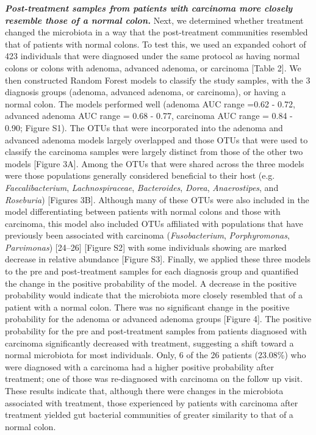 \documentclass[12pt,]{article}
\begin{document}
\textbf{\emph{Post-treatment samples from patients with carcinoma more
closely resemble those of a normal colon.}} Next, we determined whether
treatment changed the microbiota in a way that the post-treatment
communities resembled that of patients with normal colons. To test this,
we used an expanded cohort of 423 individuals that were diagnosed under
the same protocol as having normal colons or colons with adenoma,
advanced adenoma, or carcinoma {[}Table 2{]}. We then constructed Random
Forest models to classify the study samples, with the 3 diagnosis groups
(adenoma, advanced adenoma, or carcinoma), or having a normal colon. The
models performed well (adenoma AUC range =0.62 - 0.72, advanced adenoma
AUC range = 0.68 - 0.77, carcinoma AUC range = 0.84 - 0.90; Figure S1).
The OTUs that were incorporated into the adenoma and advanced adenoma
models largely overlapped and those OTUs that were used to classify the
carcinoma samples were largely distinct from those of the other two
models {[}Figure 3A{]}. Among the OTUs that were shared across the three
models were those populations generally considered beneficial to their
host (e.g. \emph{Faecalibacterium}, \emph{Lachnospiraceae},
\emph{Bacteroides}, \emph{Dorea}, \emph{Anaerostipes}, and
\emph{Roseburia}) {[}Figures 3B{]}. Although many of these OTUs were
also included in the model differentiating between patients with normal
colons and those with carcinoma, this model also included OTUs
affiliated with populations that have previously been associated with
carcinoma (\emph{Fusobacterium}, \emph{Porphyromonas},
\emph{Parvimonas}) {[}24--26{]} {[}Figure S2{]} with some individuals
showing are marked decrease in relative abundance {[}Figure S3{]}.
Finally, we applied these three models to the pre and post-treatment
samples for each diagnosis group and quantified the change in the
positive probability of the model. A decrease in the positive
probability would indicate that the microbiota more closely resembled
that of a patient with a normal colon. There was no significant change
in the positive probability for the adenoma or advanced adenoma groups
{[}Figure 4{]}. The positive probability for the pre and post-treatment
samples from patients diagnosed with carcinoma significantly decreased
with treatment, suggesting a shift toward a normal microbiota for most
individuals. Only, 6 of the 26 patients (23.08\%) who were diagnosed
with a carcinoma had a higher positive probability after treatment; one
of those was re-diagnosed with carcinoma on the follow up visit. These
results indicate that, although there were changes in the microbiota
associated with treatment, those experienced by patients with carcinoma
after treatment yielded gut bacterial communities of greater similarity
to that of a normal colon.
\end{document}
